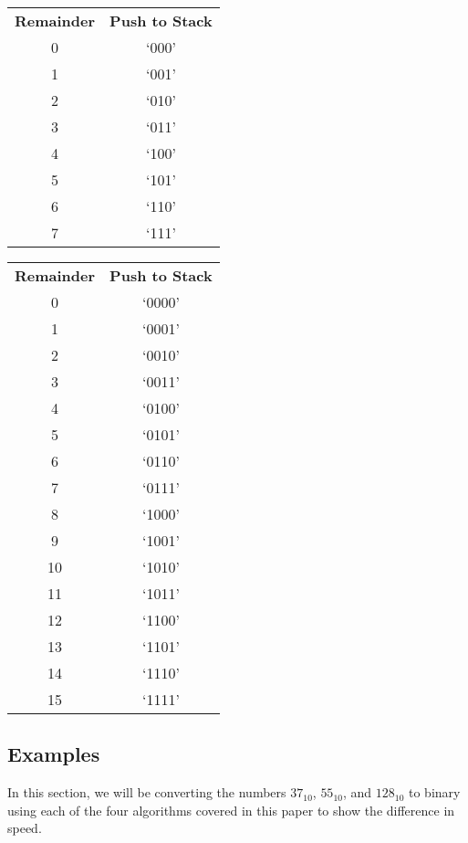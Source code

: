 \documentclass[12pt]{article}
\begin{document}
\begin{center}
  \begin{tabular}{c|c}
    \textbf{Remainder} & \textbf{Push to Stack} \\
    0 & `000' \\
    1 & `001' \\
    2 & `010' \\
    3 & `011' \\
    4 & `100' \\
    5 & `101' \\
    6 & `110' \\
    7 & `111'
  \end{tabular}
\end{center}

\begin{center}
  \begin{tabular}{c|c}
    \textbf{Remainder} & \textbf{Push to Stack} \\
    0 & `0000' \\
    1 & `0001' \\
    2 & `0010' \\
    3 & `0011' \\
    4 & `0100' \\
    5 & `0101' \\
    6 & `0110' \\
    7 & `0111' \\
    8 & `1000' \\
    9 & `1001' \\
    10 & `1010' \\
    11 & `1011' \\
    12 & `1100' \\
    13 & `1101' \\
    14 & `1110' \\
    15 & `1111'
  \end{tabular}
\end{center}



\newpage %



\begin{center}
  \section{Examples}
\end{center}
In this section, we will be converting the numbers $37_{10}$, $55_{10}$, and $128_{10}$ to binary using each of the four algorithms covered in this paper to show the difference in speed.
\end{document}

